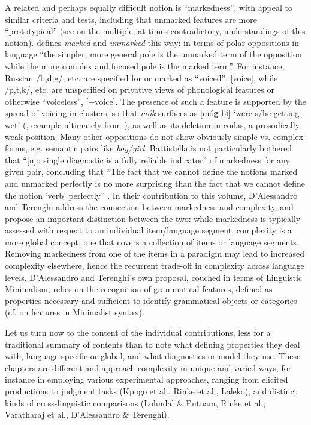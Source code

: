 \documentclass[output=paper,colorlinks,citecolor=brown]{langscibook}
\begin{document}
A related and perhaps equally difficult notion is “markedness”, with appeal to similar criteria and tests, including that unmarked features are more “prototypical” (see \citealt{Haspelmath2006} on the multiple, at times contradictory, understandings of this notion). \citet[1]{Battistella1990} defines \textit{marked} and \textit{unmarked} this way: in terms of polar oppositions in language “the simpler, more general pole is the unmarked term of the opposition while the more complex and focused pole is the marked term”. For instance, Russian /b,d,g/, etc. are specified for or marked as “voiced”, [voice], while /p,t,k/, etc. are unspecified on privative views of phonological features or otherwise “voiceless”, [−voice]. The presence of such a feature is supported by the spread of voicing in clusters, so that \textit{mók} surfaces as [mó\textbf{g} bɨ] `were s/he getting wet' (\citealt[93]{Dresher2009}, example ultimately from \citealt[22]{Halle1971}), as well as its deletion in codas, a prosodically weak position. Many other oppositions do not show obviously simple vs. complex forms, e.g. semantic pairs like \textit{boy/girl}. Battistella is not particularly bothered that “[n]o single diagnostic is a fully reliable indicator” of markedness for any given pair, concluding that “The fact that we cannot define the notions marked and unmarked perfectly is no more surprising than the fact that we cannot define the notion `verb' perfectly” \parencite[45]{Battistella1990}. In their contribution to this volume, D’Alessandro and Terenghi address the connection between markedness and complexity, and propose an important distinction between the two: while markedness is typically assessed with respect to an individual item/language segment, complexity is a more global concept, one that covers a collection of items or language segments. Removing markedness from one of the items in a paradigm may lead to increased complexity elsewhere, hence the recurrent trade-off in complexity across language levels. D’Alessandro and Terenghi’s own proposal, couched in terms of Linguistic Minimalism, relies on the recognition of grammatical features, defined as properties necessary and sufficient to identify grammatical objects or categories (cf. \citealt{AdgerSvenonius2012} on features in Minimalist syntax). 

Let us turn now to the content of the individual contributions, less for a traditional summary of contents than to note what defining properties they deal with, language specific or global, and what diagnostics or model they use. These chapters are different and approach complexity in unique and varied ways, for instance in employing various experimental approaches, ranging from elicited productions to judgment tasks (Kpogo et al., Rinke et al., Laleko), and distinct kinds of cross-linguistic comparisons (Lohndal \& Putnam, Rinke et al., Varatharaj et al., D’Alessandro \& Terenghi).
\end{document}
